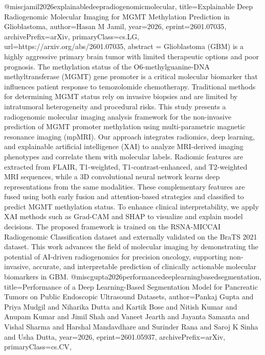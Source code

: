 {}@misc{jamil2026explainabledeepradiogenomicmolecular,
      title={Explainable Deep Radiogenomic Molecular Imaging for MGMT Methylation Prediction in Glioblastoma}, 
      author={Hasan M Jamil},
      year={2026},
      eprint={2601.07035},
      archivePrefix={arXiv},
      primaryClass={cs.LG},
      url={https://arxiv.org/abs/2601.07035},
      abstract = {Glioblastoma (GBM) is a highly aggressive primary brain tumor with limited therapeutic options and poor prognosis. The methylation status of the O6-methylguanine-DNA methyltransferase (MGMT) gene promoter is a critical molecular biomarker that influences patient response to temozolomide chemotherapy. Traditional methods for determining MGMT status rely on invasive biopsies and are limited by intratumoral heterogeneity and procedural risks. This study presents a radiogenomic molecular imaging analysis framework for the non-invasive prediction of MGMT promoter methylation using multi-parametric magnetic resonance imaging (mpMRI).   Our approach integrates radiomics, deep learning, and explainable artificial intelligence (XAI) to analyze MRI-derived imaging phenotypes and correlate them with molecular labels. Radiomic features are extracted from FLAIR, T1-weighted, T1-contrast-enhanced, and T2-weighted MRI sequences, while a 3D convolutional neural network learns deep representations from the same modalities. These complementary features are fused using both early fusion and attention-based strategies and classified to predict MGMT methylation status.   To enhance clinical interpretability, we apply XAI methods such as Grad-CAM and SHAP to visualize and explain model decisions. The proposed framework is trained on the RSNA-MICCAI Radiogenomic Classification dataset and externally validated on the BraTS 2021 dataset. This work advances the field of molecular imaging by demonstrating the potential of AI-driven radiogenomics for precision oncology, supporting non-invasive, accurate, and interpretable prediction of clinically actionable molecular biomarkers in GBM.}
}@misc{gupta2026performancedeeplearningbasedsegmentation,
      title={Performance of a Deep Learning-Based Segmentation Model for Pancreatic Tumors on Public Endoscopic Ultrasound Datasets}, 
      author={Pankaj Gupta and Priya Mudgil and Niharika Dutta and Kartik Bose and Nitish Kumar and Anupam Kumar and Jimil Shah and Vaneet Jearth and Jayanta Samanta and Vishal Sharma and Harshal Mandavdhare and Surinder Rana and Saroj K Sinha and Usha Dutta},
      year={2026},
      eprint={2601.05937},
      archivePrefix={arXiv},
      primaryClass={cs.CV},
}
